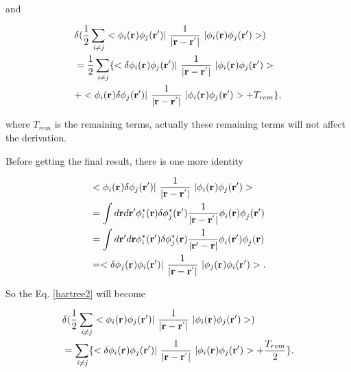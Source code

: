 \documentclass[a4paper, 12pt, titlepage,oneside,drop]{kthesis}
\begin{document}
\noindent and 

\begin{equation}\begin{split}\label{hartree2}
&  \delta( \frac{1}{2} \suminj<i><j> <\bwf<i><> \bwfn<j><'>|\ \frac{1}{|\textbf{r} - \textbf{r}^{'} |} \ | \bwf<i><> \bwfn<j><'>>)   \\
& =   \frac{1}{2} \suminj<i><j> \{  <\delta \bwf<i><> \bwfn<j><'>|\ \frac{1}{|\textbf{r} - \textbf{r}^{'} |} \ | \bwf<i><> \bwfn<j><'>>  \\
& +   < \bwf<i><> \delta \bwfn<j><'>|\ \frac{1}{|\textbf{r} - \textbf{r}^{'} |} \ | \bwf<i><> \bwfn<j><'>> +  T_{rem}\},
\end{split}\end{equation}

\noindent where $T_{rem}$ is the remaining terms, actually these remaining terms will not affect the derivation.

Before getting the final result, there is one more identity 

\begin{equation}\begin{split}\label{hartreelabel1}
& < \bwf<i><> \delta \bwfn<j><'>|\ \frac{1}{|\textbf{r} - \textbf{r}^{'} |} \ | \bwf<i><> \bwfn<j><'>> \\
& = \int d \textbf{r} d \textbf{r}{'}  \phi_{i}^{*} (\textbf{r}{}) \delta \phi_{j}^{*} (\textbf{r}{'}) \frac{1}{|\textbf{r} - \textbf{r}^{'} |}  \phi_{i}^{} (\textbf{r}{})  \phi_{j}^{} (\textbf{r}{'})\\
& = \int d \textbf{r}{'} d \textbf{r}  \phi_{i}^{*} (\textbf{r}{'}) \delta \phi_{j}^{*} (\textbf{r}{}) \frac{1}{|\textbf{r}{'} - \textbf{r} |}  \phi_{i}^{} (\textbf{r}{'})  \phi_{j}^{} (\textbf{r})\\
& = <\delta \bwf<j><> \bwfn<i><'>|\ \frac{1}{|\textbf{r} - \textbf{r}^{'} |} \ | \bwf<j><> \bwfn<i><'>>.
\end{split}\end{equation}

\noindent So the Eq. \ref{hartree2} will become 

\begin{equation}\begin{split}\label{hartree3}
&  \delta( \frac{1}{2} \suminj<i><j> <\bwf<i><> \bwfn<j><'>|\ \frac{1}{|\textbf{r} - \textbf{r}^{'} |} \ | \bwf<i><> \bwfn<j><'>>)   \\
& =  \suminj<i><j> \{  <\delta \bwf<i><> \bwfn<j><'>|\ \frac{1}{|\textbf{r} - \textbf{r}^{'} |} \ | \bwf<i><> \bwfn<j><'>> + \frac{T_{rem}}{2}\}.
\end{split}\end{equation}
\end{document}
